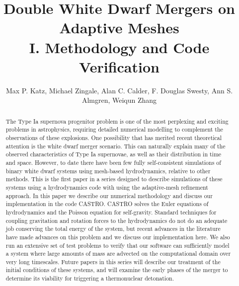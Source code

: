 \documentclass[iop]{../emulateapj}
\begin{document}
\title{Double White Dwarf Mergers on Adaptive Meshes\\ I. Methodology and Code Verification}


\author{Max P. Katz, Michael Zingale, Alan C. Calder, F. Douglas Swesty, Ann S. Almgren, Weiqun Zhang}
\begin{abstract}
The Type Ia supernova progenitor problem is one of the most perplexing and 
exciting problems in astrophysics, requiring detailed numerical modelling to 
complement the observations of these explosions. One possibility that has 
merited recent theoretical attention is the white dwarf merger scenario.
This can naturally explain many of the observed characteristics of 
Type Ia supernovae, as well as their distribution in time and space.
However, to date there have been few fully self-consistent simulations 
of binary white dwarf systems using mesh-based hydrodynamics, 
relative to other methods. This is the first paper in a series designed to 
describe simulations of these systems using a hydrodynamics code with 
using the adaptive-mesh refinement approach. In this paper we describe our numerical 
methodology and discuss our implementation in the code CASTRO. CASTRO 
solves the Euler equations of hydrodynamics 
and the Poisson equation for self-gravity. Standard techniques for 
coupling gravitation and rotation forces to the hydrodynamics do 
not do an adequate job conserving the total energy of the system, 
but recent advances in the literature have made advances on this 
problem and we discuss our implementation here. We also run an 
extensive set of test problems to verify that our software can sufficiently
model a system where large amounts of mass are advected on the computational 
domain over very long timescales. Future papers in this series will describe
our treatment of the initial conditions of these systems, and will 
examine the early phases of the merger to determine its viability
for triggering a thermonuclear detonation.

\end{abstract}
\end{document}

